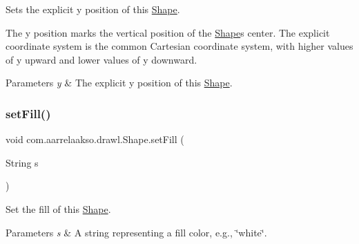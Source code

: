 Sets the explicit y position of this \hyperlink{classcom_1_1aarrelaakso_1_1drawl_1_1_shape}{Shape}. 

The y position marks the vertical position of the \hyperlink{classcom_1_1aarrelaakso_1_1drawl_1_1_shape}{Shape}\textquotesingle{}s center. The explicit coordinate system is the common Cartesian coordinate system, with higher values of y upward and lower values of y downward.


\begin{DoxyParams}{Parameters}
{\em y} & The explicit y position of this \hyperlink{classcom_1_1aarrelaakso_1_1drawl_1_1_shape}{Shape}. \\
\hline
\end{DoxyParams}
\mbox{\label{classcom_1_1aarrelaakso_1_1drawl_1_1_shape_a2a2868c85bfbf4d2940d929950001b3d}} 
\subsubsection{\texorpdfstring{set\+Fill()}{setFill()}}
{\footnotesize\ttfamily void com.\+aarrelaakso.\+drawl.\+Shape.\+set\+Fill (\begin{DoxyParamCaption}\item[{String}]{s }\end{DoxyParamCaption})\hspace{0.3cm}{\ttfamily [inherited]}}



Set the fill of this \hyperlink{classcom_1_1aarrelaakso_1_1drawl_1_1_shape}{Shape}. 


\begin{DoxyParams}{Parameters}
{\em s} & A string representing a fill color, e.\+g., \char`\"{}white\char`\"{}. \\
\hline
\end{DoxyParams}
\mbox{\label{classcom_1_1aarrelaakso_1_1drawl_1_1_shape_acb96a96a1d43132def75a38c136c563f}} 
